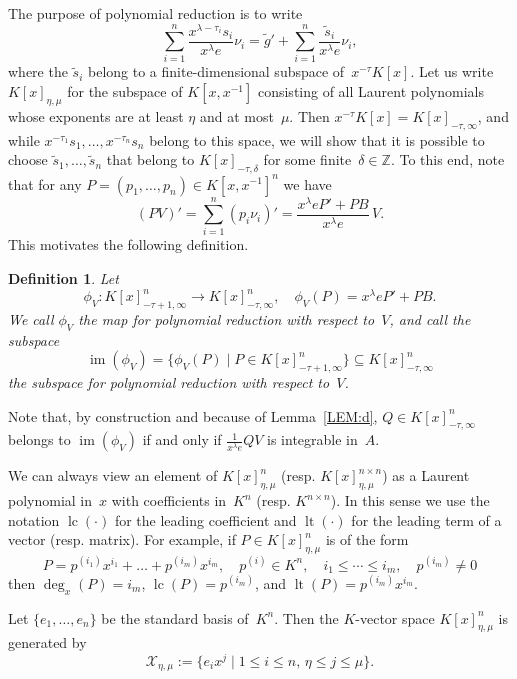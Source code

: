 \documentclass[final,1p,times,authoryear]{elsarticle}
\newtheorem{defi}[theorem]{Definition}
\newcommand{\cX}{ {\mathcal X}}
\let\set\mathbb
\def\lc{\operatorname{lc}}
\def\lt{\operatorname{lt}}
\def\im{\operatorname{im}}
\begin{document}
The purpose of polynomial reduction is to write
\[
  \sum_{i=1}^n\frac{x^{\lambda-\tau_i}s_i}{x^{\lambda}e}\nu_i=\tilde g'+
  \sum_{i=1}^n\frac{\tilde s_i}{x^\lambda e}\nu_i,
\]
where the $\tilde s_i$ belong to a finite-dimensional subspace of~$x^{-\tau}K[x]$.
Let us write $K[x]_{\eta,\mu}$ for the subspace of $K[x,x^{-1}]$ consisting of all Laurent polynomials
whose exponents are at least $\eta$ and at most~$\mu$. Then $x^{-\tau}K[x]=K[x]_{-\tau,\infty}$, and
while $x^{-\tau_1}s_1,\dots,x^{-\tau_n}s_n$ belong to this space, we will show that it is possible to
choose $\tilde s_1,\dots,\tilde s_n$ that belong to $K[x]_{-\tau,\delta}$ for some finite~$\delta\in\set Z$.
To this end, note that for any $P = (p_1, \ldots, p_n)\in K[x,x^{-1}]^n$ we have
\begin{equation} \label{EQ:polyred}
  (PV)' = \sum_{i=1}^n (p_i \nu_i)' = \frac{x^\lambda eP' + PB}{x^\lambda e}\,V.
\end{equation}
This motivates the following definition.

\begin{defi}
  Let
  \[
    \phi_V\colon K[x]_{-\tau+1,\infty}^n \to K[x]_{-\tau,\infty}^n,\quad
    \phi_V(P) = x^\lambda eP' + PB.
  \]
  We call $\phi_V$ the \emph{map for polynomial reduction} with respect to~$V$, and call
  the subspace
\[
 \im(\phi_V) = \bigl\{\phi_V(P) \mid P \in K[x]_{-\tau+1,\infty}^n\bigr\}\subseteq K[x]_{-\tau,\infty}^n
\]
the \emph{subspace for polynomial reduction} with respect to~$V$.
\end{defi}

Note that, by construction and because of Lemma~\ref{LEM:d}, $Q\in K[x]_{-\tau,\infty}^n$ belongs to
$\im(\phi_V)$ if and only if $\frac{1}{x^\lambda e}QV$ is integrable in~$A$.

We can always view an element of $K[x]_{\eta,\mu}^n$ (resp. $K[x]_{\eta,\mu}^{n\times n}$) as a Laurent polynomial in~$x$
with coefficients in~$K^n$ (resp. $K^{n\times n}$). In this sense we use the notation $\lc(\cdot)$
for the leading coefficient and $\lt(\cdot)$ for the leading term of a vector (resp. matrix).
For example, if $P\in K[x]_{\eta,\mu}^n$ is of the form
\[
  P = p^{(i_1)}x^{i_1} + \dots + p^{(i_m)}x^{i_m},\quad p^{(i)}\in K^n,\quad i_1\leq\cdots\leq i_m,\quad p^{(i_m)}\neq0
\]
then $\deg_x(P)=i_m$, $\lc(P)=p^{(i_m)}$, and $\lt(P)=p^{(i_m)}x^{i_m}$.

Let $\{e_1, \ldots, e_n\}$ be the standard basis of~$K^n$.
Then the $K$-vector space $K[x]_{\eta,\mu}^n$ is generated by
\[
  \cX_{\eta,\mu}:= \bigl\{e_ix^j \mathrel{|} 1\leq i \leq n,\, \eta\leq j\leq \mu\bigr\}.
\]
\end{document}
